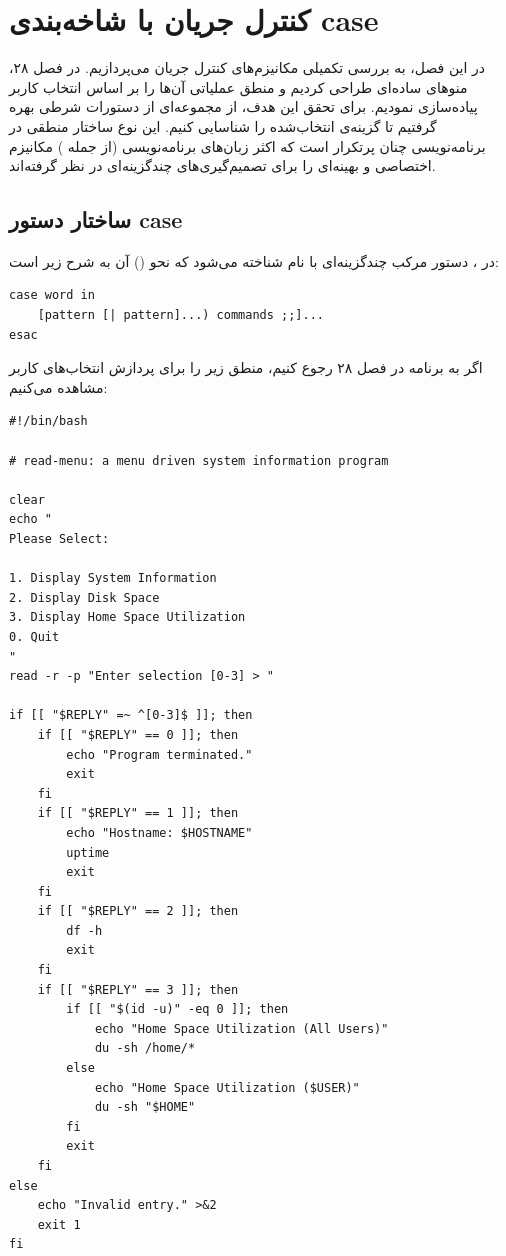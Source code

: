 \chapter{کنترل جریان با شاخه‌بندی case}

در این فصل، به بررسی تکمیلی مکانیزم‌های کنترل جریان می‌پردازیم. در فصل ۲۸، منوهای ساده‌ای طراحی کردیم و منطق عملیاتی آن‌ها را بر اساس انتخاب کاربر پیاده‌سازی نمودیم. برای تحقق این هدف، از مجموعه‌ای از دستورات شرطی  بهره گرفتیم تا گزینه‌ی انتخاب‌شده را شناسایی کنیم. این نوع ساختار منطقی در برنامه‌نویسی چنان پرتکرار است که اکثر زبان‌های برنامه‌نویسی (از جمله ) مکانیزم اختصاصی و بهینه‌ای را برای تصمیم‌گیری‌های چندگزینه‌ای در نظر گرفته‌اند.

\section{ساختار دستور case}

در ، دستور مرکب چندگزینه‌ای با نام  شناخته می‌شود که نحو () آن به شرح زیر است:

\begin{latin}
\begin{lstlisting}
case word in
    [pattern [| pattern]...) commands ;;]...
esac
\end{lstlisting}
\end{latin}

اگر به برنامه  در فصل ۲۸ رجوع کنیم، منطق زیر را برای پردازش انتخاب‌های کاربر مشاهده می‌کنیم:

\begin{latin}
\begin{lstlisting}
#!/bin/bash

# read-menu: a menu driven system information program

clear
echo "
Please Select:

1. Display System Information
2. Display Disk Space
3. Display Home Space Utilization
0. Quit
"
read -r -p "Enter selection [0-3] > "

if [[ "$REPLY" =~ ^[0-3]$ ]]; then
    if [[ "$REPLY" == 0 ]]; then
        echo "Program terminated."
        exit
    fi
    if [[ "$REPLY" == 1 ]]; then
        echo "Hostname: $HOSTNAME"
        uptime
        exit
    fi
    if [[ "$REPLY" == 2 ]]; then
        df -h
        exit
    fi
    if [[ "$REPLY" == 3 ]]; then
        if [[ "$(id -u)" -eq 0 ]]; then
            echo "Home Space Utilization (All Users)"
            du -sh /home/*
        else
            echo "Home Space Utilization ($USER)"
            du -sh "$HOME"
        fi
        exit
    fi
else
    echo "Invalid entry." >&2
    exit 1
fi
\end{lstlisting}
\end{latin}

